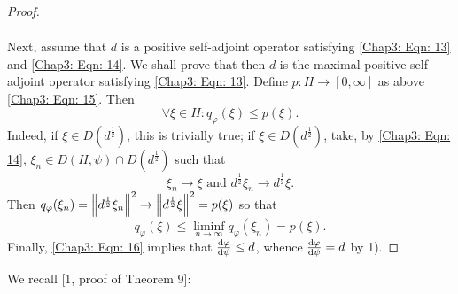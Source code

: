\begin{proof}
\[\begin{split}
        \end{split}
    \]\par
    Next, assume that $d$ is a positive self-adjoint operator satisfying \eqref{Chap3: Eqn: 13} and \eqref{Chap3: Eqn: 14}. We shall prove that then $d$ is the maximal positive self-adjoint operator satisfying \eqref{Chap3: Eqn: 13}. Define $p:H \to [0,\infty]$ as above \eqref{Chap3: Eqn: 15}. Then
    \begin{equation}\label{Chap3: Eqn: 16}
        \forall \xi\in H:q_\varphi(\xi)\leq p(\xi).
    \end{equation}
    Indeed, if $\xi\in D(d^\frac{1}{2})$, this is trivially true; if $\xi\in D(d^\frac{1}{2})$, take, by \eqref{Chap3: Eqn: 14}, $\xi_n\in D(H,\psi)\cap D(d^\frac{1}{2})$ such that
    \[
        \xi_n\to \xi\text{ and }d^\frac{1}{2}\xi_n\to d^\frac{1}{2}\xi.
    \]
    Then $q_\varphi(\xi_n)=\norm{d^\frac{1}{2}\xi_n}^2\to \norm{d^\frac{1}{2}\xi}^2=p(\xi)$ so that
    \[
        q_\varphi(\xi)\leq \liminf_{n\to \infty}q_\varphi(\xi_n)=p(\xi).
    \]
    Finally, \eqref{Chap3: Eqn: 16} implies that $\dv{\varphi}{\psi}\leq d$, whence $\dv{\varphi}{\psi}=d$ by 1).
\end{proof}
We recall [1, proof of Theorem 9]:
% 